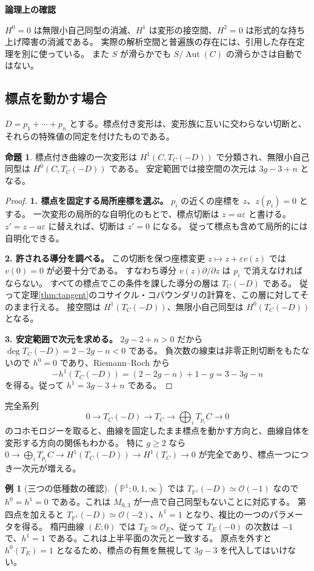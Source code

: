 \documentclass[dvipdfmx,a4paper,11pt]{article}
\theoremstyle{definition}
\newtheorem{prop}[thm]{命題}
\newtheorem{exa}[thm]{例}
\newcommand{\PP}{\mathbb P}\newcommand{\HH}{\mathbb H}
\newcommand{\OO}{\mathcal O}\newcommand{\MM}{\mathcal M}\newcommand{\TT}{\mathcal T}
\DeclareMathOperator{\Aut}{Aut}\DeclareMathOperator{\Pic}{Pic}\DeclareMathOperator{\Hom}{Hom}
\newcommand{\eps}{\varepsilon}
\newenvironment{point}{\begin{tcolorbox}[mybox,colback=green!2]\textbf{論理上の確認}\par}{\end{tcolorbox}}
\begin{document}
\begin{point}
$H^0=0$ は無限小自己同型の消滅、$H^1$ は変形の接空間、$H^2=0$ は形式的な持ち上げ障害の消滅である。
実際の解析空間と普遍族の存在には、引用した存在定理を別に使っている。
また $S$ が滑らかでも $S/\Aut(C)$ の滑らかさは自動ではない。
\end{point}

\subsection{標点を動かす場合}
$D=p_1+\cdots+p_n$ とする。標点付き変形は、変形族に互いに交わらない切断と、それらの特殊値の同定を付けたものである。
\begin{prop}\label{prop:pointeddef}
標点付き曲線の一次変形は $H^1(C,T_C(-D))$ で分類され、無限小自己同型は $H^0(C,T_C(-D))$ である。
安定範囲では接空間の次元は $3g-3+n$ となる。
\end{prop}
\begin{proof}
\textbf{1. 標点を固定する局所座標を選ぶ。}
$p_i$ の近くの座標を $z$、$z(p_i)=0$ とする。
一次変形の局所的な自明化のもとで、標点切断は $z=a\eps$ と書ける。
$z'=z-a\eps$ に替えれば、切断は $z'=0$ になる。
従って標点も含めて局所的には自明化できる。

\textbf{2. 許される導分を調べる。}
この切断を保つ座標変更 $z\mapsto z+\eps v(z)$ では $v(0)=0$ が必要十分である。
すなわち導分 $v(z)\partial/\partial z$ は $p_i$ で消えなければならない。
すべての標点でこの条件を課した導分の層は $T_C(-D)$ である。
従って定理\ref{thm:tangent}のコサイクル・コバウンダリの計算を、この層に対してそのまま行える。
接空間は $H^1(T_C(-D))$、無限小自己同型は $H^0(T_C(-D))$ となる。

\textbf{3. 安定範囲で次元を求める。}
$2g-2+n>0$ だから $\deg T_C(-D)=2-2g-n<0$ である。
負次数の線束は非零正則切断をもたないので $h^0=0$ であり、Riemann--Roch から
\[
-h^1(T_C(-D))=(2-2g-n)+1-g=3-3g-n
\]
を得る。従って $h^1=3g-3+n$ である。
\end{proof}
完全系列
\[
0\to T_C(-D)\to T_C\to\bigoplus_iT_{p_i}C\to0
\]
のコホモロジーを取ると、曲線を固定したまま標点を動かす方向と、曲線自体を変形する方向の関係もわかる。
特に $g\ge2$ なら
$0\to\bigoplus_iT_{p_i}C\to H^1(T_C(-D))\to H^1(T_C)\to0$
が完全であり、標点一つにつき一次元が増える。

\begin{exa}[三つの低種数の確認]
$(\PP^1;0,1,\infty)$ では $T_{\PP^1}(-D)\simeq\OO(-1)$ なので $h^0=h^1=0$ である。これは $M_{0,3}$ が一点で自己同型もないことに対応する。
第四点を加えると $T_{\PP^1}(-D)\simeq\OO(-2)$、$h^1=1$ となり、複比の一つのパラメータを得る。
楕円曲線 $(E;0)$ では $T_E\simeq\OO_E$、従って $T_E(-0)$ の次数は $-1$ で、$h^1=1$ である。これは上半平面の次元と一致する。
原点を外すと $h^0(T_E)=1$ となるため、標点の有無を無視して $3g-3$ を代入してはいけない。
\end{exa}
\end{document}
